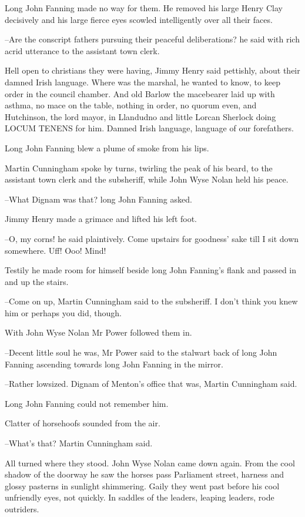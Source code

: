 Long John Fanning made no way for them.
He removed his large Henry Clay decisively
and his large fierce eyes scowled intelligently over all their faces.

--Are the conscript fathers pursuing their peaceful deliberations?
he said with rich acrid utterance to the assistant town clerk.

Hell open to christians they were having, Jimmy Henry said pettishly,
about their damned Irish language. Where was the marshal, he wanted to
know, to keep order in the council chamber. And old Barlow the macebearer
laid up with asthma, no mace on the table,
nothing in order,
no quorum even,
and Hutchinson, the lord mayor, in Llandudno and little Lorcan
Sherlock doing LOCUM TENENS for him. Damned Irish language, language of
our forefathers.

Long John Fanning blew a plume of smoke from his lips.

Martin Cunningham spoke by turns, twirling the peak of his beard, to the
assistant town clerk and the subsheriff, while John Wyse Nolan held his
peace.

--What Dignam was that? long John Fanning asked.

Jimmy Henry made a grimace and lifted his left foot.

--O, my corns!
he said plaintively.
Come upstairs for goodness' sake till I sit down somewhere.
Uff! Ooo! Mind!

Testily he made room for himself beside long John Fanning's flank and
passed in and up the stairs.

--Come on up, Martin Cunningham said to the subsheriff. I don't think you
knew him or perhaps you did, though.

With John Wyse Nolan Mr Power followed them in.

--Decent little soul he was, Mr Power said to the stalwart back of long
John Fanning ascending towards long John Fanning in the mirror.

--Rather lowsized. Dignam of Menton's office that was, Martin Cunningham
said.

 Long John Fanning could not remember him.%

 Clatter of horsehoofs sounded from the air.

--What's that? Martin Cunningham said.

All turned where they stood. John Wyse Nolan came down again. From the
cool shadow of the doorway he saw the horses pass Parliament street,
harness and glossy pasterns in sunlight shimmering. Gaily they went past
before his cool unfriendly eyes, not quickly. In saddles of the leaders,
leaping leaders, rode outriders.

